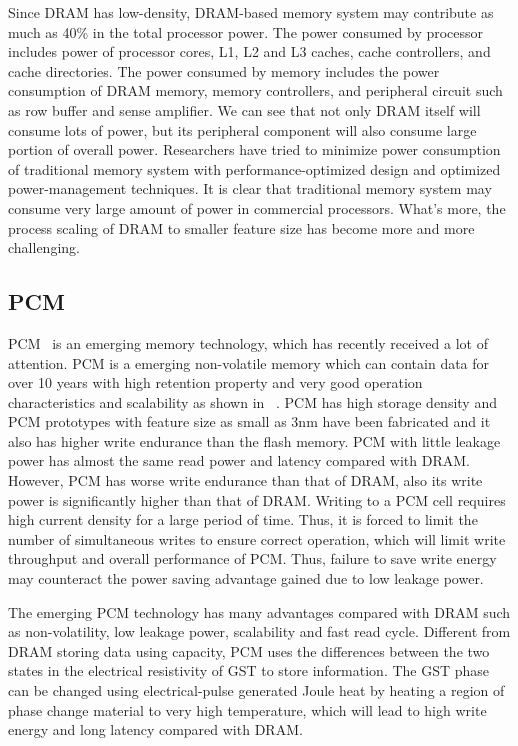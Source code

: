 

Since DRAM has low-density, DRAM-based memory system may contribute as much as 40\% in the total processor power. The power consumed by processor includes power of processor cores, L1, L2 and L3 caches, cache controllers, and cache directories. The power consumed by memory includes the power consumption of DRAM memory, memory controllers, and peripheral circuit such as row buffer and sense amplifier. We can see that not only DRAM itself will consume lots of power, but its peripheral component will also consume large portion of overall power. Researchers have tried to minimize power consumption of traditional memory system with performance-optimized design and optimized power-management techniques. It is clear that traditional memory system may consume very large amount of power in commercial processors. What's more, the process scaling of DRAM to smaller feature size has become more and more challenging.   


\subsection{PCM }
\label{sec:backgrouond:PCM}


PCM ~\cite{5609179}is an emerging memory technology, which has recently received a lot of attention. PCM is a emerging non-volatile memory which can contain data for over 10 years with high retention property and very good operation characteristics and scalability as shown in ~. PCM has high storage density and PCM prototypes with feature size as small as 3nm have been fabricated and it also has higher write endurance than the flash memory. PCM with little leakage power has almost the same read power and latency compared with DRAM. However, PCM has worse write endurance than that of DRAM, also its write power is significantly higher than that of DRAM. Writing to a PCM cell requires high current density for a large period of time. Thus, it is forced to limit the number of simultaneous writes to ensure correct operation, which will limit write throughput and overall performance of PCM. Thus, failure to save write energy may counteract the power saving advantage gained due to low leakage power.  

The emerging PCM technology has many advantages compared with DRAM such as non-volatility, low leakage power, scalability and fast read cycle. Different from DRAM storing data using capacity, PCM uses the differences between the two states in the electrical resistivity of GST to store information. The GST phase can be changed using electrical-pulse generated Joule heat by heating a region of phase change material to very high temperature, which will lead to high write energy and long latency compared with DRAM.       



